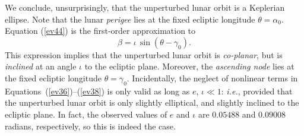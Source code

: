  We conclude, unsurprisingly, that the unperturbed lunar orbit is a Keplerian ellipse.
Note that the lunar {\em perigee}\/ lies at the  fixed ecliptic longitude $\theta=\alpha_0$. Equation (\ref{ev44}) is the first-order approximation to
 \begin{equation}
 \beta= \iota\,\sin(\theta-\gamma_0).
 \end{equation}
 This expression implies that the unperturbed lunar orbit is {\em co-planar}, but is {\em inclined}\/ at an angle $\iota$ to the ecliptic plane.
Moreover, the {\em ascending node}\/  lies at the fixed ecliptic  longitude $\theta=\gamma_0$.  Incidentally, the neglect of nonlinear terms in Equations~(\ref{ev36})--(\ref{ev38}) is only valid as long as $e$, $\iota\ll 1$: {\em i.e.}, provided that the unperturbed lunar orbit is only
 slightly elliptical, and slightly inclined to the ecliptic plane. In fact, the observed values of $e$ and
 $\iota$ are $0.05488$ and $0.09008$ radians, respectively, so this is indeed the case.
 
